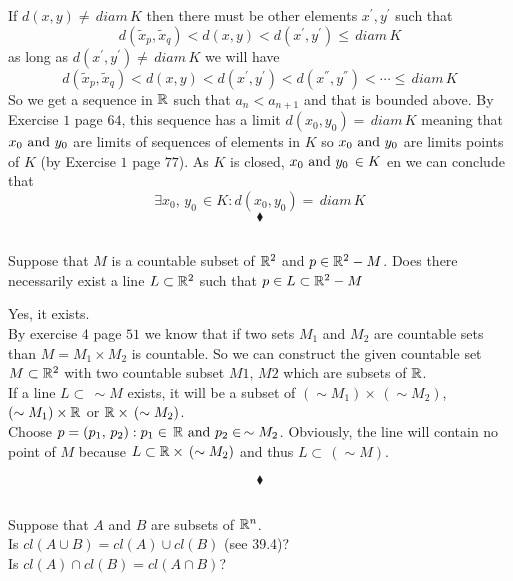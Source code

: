 If $d(x,y)\neq \, diam \, K$ then there must be other elements $x^{'},y^{'}$ such that 
$$d(\tilde{x}_p,\tilde{x}_q)<d(x,y)<d(x^{'},y^{'})\leq \, diam \, K$$
as long as $d(x^{'},y^{'})\neq \, diam \, K$ we will have 
$$d(\tilde{x}_p,\tilde{x}_q)<d(x,y)<d(x^{'},y^{'})<d(x^{''},y^{''})<\cdots \leq \, diam \, K$$
So we get a sequence in $\mathbb{R}$ such that $a_n<a_{n+1}$ and that is  bounded above. By Exercise $1$ page $64$, this sequence has a limit $d(x_0,y_0)= \, diam \, K$ meaning that $x_0\text{ and }  y_0$  are limits of sequences of elements in $K$ so $x_0\text{ and }  y_0$ are limits points of $K$ (by Exercise $1$ page $77$). As $K$ is closed, $x_0\text{ and } y_0\, \in K$ en we can conclude that $$\exists x_0,\, y_0\,\in K: d(x_0, y_0)= \, diam\, K$$
$$\blacklozenge$$
\renewcommand{\thesubsection}{\thesection.\RomanNumeralCaps{5}}
\subsection{}

\begin{tcolorbox}
Suppose that $M$ is a countable subset of $\mathbb{R}^2$ and $p\in \mathbb{R}^2-M$. Does there necessarily exist a line $L \subset\mathbb{R}^2$ such that $p\in L\subset \mathbb{R}^2-M$
\end{tcolorbox}
Yes, it exists.\\
By exercise $4$ page $51$ we know that if two sets $M_1$ and $M_2$ are countable sets than $M=M_1\times M_2$ is countable. So we can construct the given countable set $M\subset \mathbb{R}^2$ with two countable subset $M1,\, M2$ which are subsets of $\mathbb{R}$. \\
If a line $L\subset\,  \sim M$ exists, it will be a subset of $(\sim M_1)\times\,  (\sim M_2)$, $(\sim M_1)\times \mathbb{R}$ or $\mathbb{R}\times \, (\sim M_2)$.\\
Choose $p=(p_1,\, p_2): p_1\in \,\mathbb{R}\text{ and } p_2 \in \,\sim M_2$. Obviously, the line will contain no point of $M$ because $L\subset \mathbb{R}\times \,( \sim M_2)$ and thus $L\subset\, (\sim M)$.


$$\blacklozenge$$

\renewcommand{\thesubsection}{\thesection.\RomanNumeralCaps{6}}
\subsection{}

\begin{tcolorbox}
Suppose that $A$ and $B$ are subsets of $\mathbb{R}^n$.\\ Is $cl(A \cup B)= cl(A)\cup cl(B)$ (see 39.4)?\\ Is $cl(A)\cap cl(B)=cl(A \cap B)$?
\end{tcolorbox}

